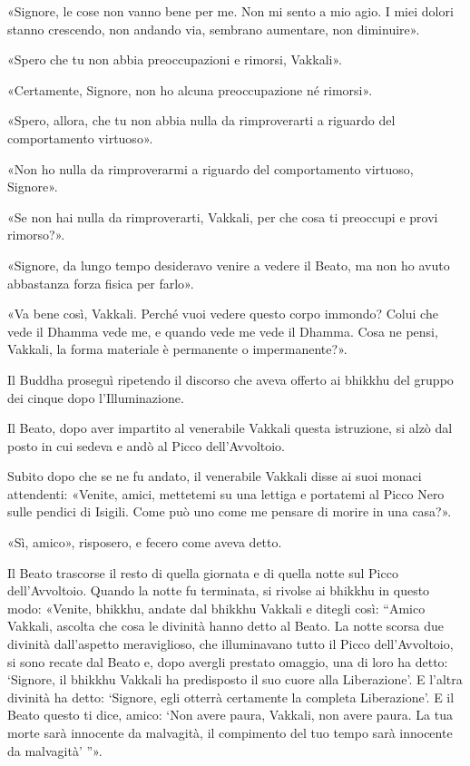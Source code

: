 «Signore, le cose non vanno bene per me. Non mi sento a mio agio. I miei
dolori stanno crescendo, non andando via, sembrano aumentare, non
diminuire».


«Spero che tu non abbia preoccupazioni e rimorsi, Vakkali».


«Certamente, Signore, non ho alcuna preoccupazione né rimorsi».


«Spero, allora, che tu non abbia nulla da rimproverarti a riguardo del
comportamento virtuoso».


«Non ho nulla da rimproverarmi a riguardo del comportamento virtuoso,
Signore».


«Se non hai nulla da rimproverarti, Vakkali, per che cosa ti preoccupi e
provi rimorso?».


«Signore, da lungo tempo desideravo venire a vedere il Beato, ma non ho
avuto abbastanza forza fisica per farlo».


«Va bene così, Vakkali. Perché vuoi vedere questo corpo immondo? Colui
che vede il Dhamma vede me, e quando vede me vede il Dhamma. Cosa ne
pensi, Vakkali, la forma materiale è permanente o impermanente?».


 Il Buddha proseguì ripetendo il discorso che aveva
offerto ai bhikkhu del gruppo dei cinque dopo l’Illuminazione.


 Il Beato, dopo aver impartito al venerabile Vakkali questa
istruzione, si alzò dal posto in cui sedeva e andò al Picco
dell’Avvoltoio.


Subito dopo che se ne fu andato, il venerabile Vakkali disse ai suoi
monaci attendenti: «Venite, amici, mettetemi su una lettiga e portatemi
al Picco Nero sulle pendici di Isigili. Come può uno come me pensare di
morire in una casa?».


«Sì, amico», risposero, e fecero come aveva detto.


Il Beato trascorse il resto di quella giornata e di quella notte sul
Picco dell’Avvoltoio. Quando la notte fu terminata, si rivolse ai
bhikkhu in questo modo: «Venite, bhikkhu, andate dal bhikkhu Vakkali e
ditegli così: “Amico Vakkali, ascolta che cosa le divinità hanno detto
al Beato. La notte scorsa due divinità dall’aspetto meraviglioso, che
illuminavano tutto il Picco dell’Avvoltoio, si sono recate dal Beato e,
dopo avergli prestato omaggio, una di loro ha detto: ‘Signore, il
bhikkhu Vakkali ha predisposto il suo cuore alla Liberazione’. E l’altra
divinità ha detto: ‘Signore, egli otterrà certamente la completa
Liberazione’. E il Beato questo ti dice, amico: ‘Non avere paura,
Vakkali, non avere paura. La tua morte sarà innocente da malvagità, il
compimento del tuo tempo sarà innocente da malvagità’ ”».


